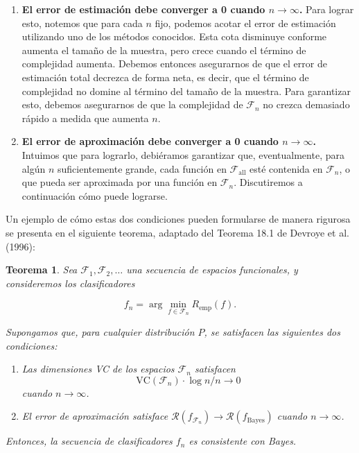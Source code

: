 \documentclass{report}
\newtheorem{thm}{Teorema}[subsection]
\begin{document}
\begin{enumerate}
    \item \textbf{El error de estimación debe converger a 0 cuando \(n \to \infty\).} Para lograr esto, 
    notemos que para cada \(n\) fijo, podemos acotar el error de estimación utilizando uno de los 
    métodos conocidos. Esta cota disminuye conforme aumenta el tamaño de la muestra, pero 
    crece cuando el término de complejidad aumenta. Debemos entonces asegurarnos de que el error de 
    estimación total decrezca de forma neta, es decir, que el término de complejidad no domine al término 
    del tamaño de la muestra. Para garantizar esto, debemos asegurarnos de que la complejidad de 
    \(\mathcal{F}_n\) no crezca demasiado rápido a medida que aumenta \(n\).

    \item \textbf{El error de aproximación debe converger a 0 cuando \(n \to \infty\).} Intuimos que 
    para lograrlo, 
    debiéramos garantizar que, eventualmente, para algún \(n\) suficientemente grande, cada función en 
    \(\mathcal{F}_{\text{all}}\) esté contenida en \(\mathcal{F}_n\), o que pueda ser aproximada por 
    una función en \(\mathcal{F}_n\). Discutiremos a continuación cómo puede lograrse.
\end{enumerate}


Un ejemplo de cómo estas dos condiciones pueden formularse de manera rigurosa se presenta en el 
siguiente teorema, adaptado del Teorema 18.1 de Devroye et al. (1996):\newline

\begin{thm}
 Sea \(\mathcal{F}_1, \mathcal{F}_2, \dots\) una secuencia de espacios funcionales, y 
consideremos los clasificadores 

\[
f_n = \arg\min_{f \in \mathcal{F}_n} R_{\text{emp}}(f).
\]

Supongamos que, para cualquier distribución \(P\), se satisfacen las siguientes dos condiciones:

\begin{enumerate}
    \item Las dimensiones VC de los espacios \(\mathcal{F}_n\) satisfacen 
    \[
    \text{VC}(\mathcal{F}_n) \cdot \log n / n \to 0
    \]
    cuando \(n \to \infty\).
    
    \item El error de aproximación satisface \(\mathcal{R}(f_{\mathcal{F}_n}) \to \mathcal{R}(f_{\text{Bayes}})\) 
    cuando \(n \to \infty\).
\end{enumerate}

Entonces, la secuencia de clasificadores \(f_n\) es consistente con Bayes.

\end{thm}
\vspace{0.3cm}
\end{document}
